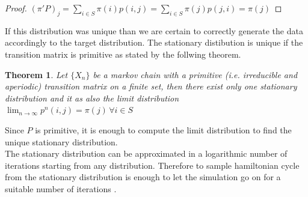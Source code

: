 \documentclass{article}
\newtheorem{theorem}{Theorem}
\begin{document}
\begin{proof}
$ (\pi'P)_j = \sum_{i \in S} \pi(i)p(i,j) = \sum_{i \in S} \pi(j)p(j,i) = \pi(j) $ 
\end{proof}
\noindent If this distribution was unique than we are certain to correctly generate the data accordingly to the target distribution. The stationary distibution is unique if the transition matrix is primitive as stated by the follwing theorem.
\begin{theorem}
Let $\{X_n\}$ be a markov chain with a primitive (i.e. irreducible and aperiodic) transition matrix on a finite set, then  there exist only one stationary distribution and it as also the limit distribution $\lim_{n \to \infty} p^n(i,j) = \pi(j)\,  \forall i \in S$
\end{theorem}
\noindent Since $P$ is primitive, it is enough to compute the limit distribution to find the unique stationary distribution. \\
The stationary distribution can be approximated in a logarithmic number of iterations starting from any distribution. Therefore to sample hamiltonian cycle from the stationary distribution is enough to let the simulation go on for a suitable number of iterations \cite{mcalgorithm}. \\
\end{document}
